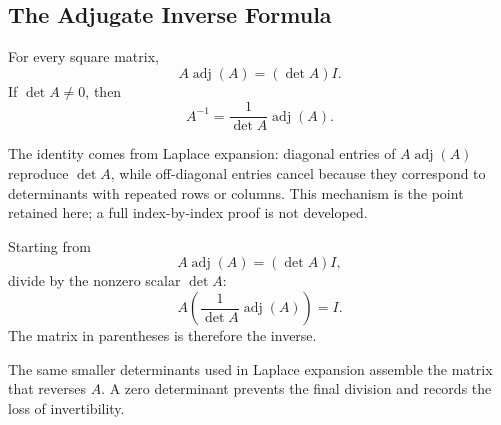 \subsection{The Adjugate Inverse Formula}

\begin{theorembox}
For every square matrix,
\[
A\operatorname{adj}(A)=(\det A)I.
\]
If $\det A\neq0$, then
\[
\boxed{A^{-1}=\frac1{\det A}\operatorname{adj}(A)}.
\]
\end{theorembox}

\begin{remarkbox}
The identity comes from Laplace expansion: diagonal entries of $A\operatorname{adj}(A)$ reproduce $\det A$, while off-diagonal entries cancel because they correspond to determinants with repeated rows or columns. This mechanism is the point retained here; a full index-by-index proof is not developed.
\end{remarkbox}

\begin{derivationbox}
Starting from
\[
A\operatorname{adj}(A)=(\det A)I,
\]
divide by the nonzero scalar $\det A$:
\[
A\left(\frac1{\det A}\operatorname{adj}(A)\right)=I.
\]
The matrix in parentheses is therefore the inverse.
\end{derivationbox}

\begin{interpretationbox}
The same smaller determinants used in Laplace expansion assemble the matrix that reverses $A$. A zero determinant prevents the final division and records the loss of invertibility.
\end{interpretationbox}
